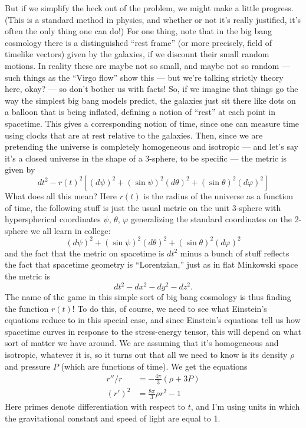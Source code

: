 \documentclass[12pt]{article}
\begin{document}
But if we simplify the heck out of the problem, we might make a little
progress. (This is a standard method in physics, and whether or not it's
really justified, it's often the only thing one can do!) For one thing,
note that in the big bang cosmology there is a distinguished ``rest
frame'' (or more precisely, field of timelike vectors) given by the
galaxies, if we discount their small random motions. In reality these
are maybe not so small, and maybe not so random --- such things as the
``Virgo flow'' show this --- but we're talking strictly theory here,
okay? --- so don't bother us with facts! So, if we imagine that things
go the way the simplest big bang models predict, the galaxies just sit
there like dots on a balloon that is being inflated, defining a notion
of ``rest'' at each point in spacetime. This gives a corresponding
notion of time, since one can measure time using clocks that are at rest
relative to the galaxies. Then, since we are pretending the universe is
completely homogeneous and isotropic --- and let's say it's a closed
universe in the shape of a 3-sphere, to be specific --- the metric is
given by
\[dt^2-r(t)^2[(d\psi)^2 + (\sin \psi)^2{(d\theta)^2 + (\sin \theta)^2 (d\varphi)^2}]\]
What does all this mean? Here \(r(t)\) is the radius of the universe as
a function of time, the following stuff is just the usual metric on the
unit 3-sphere with hyperspherical coordinates \(\psi\), \(\theta\),
\(\varphi\) generalizing the standard coordinates on the 2-sphere we all
learn in college:
\[(d\psi)^2 + (\sin \psi)^2{(d\theta)^2 + (\sin \theta)^2 (d\varphi)^2}\]
and the fact that the metric on spacetime is \(dt^2\) minus a bunch of
stuff reflects the fact that spacetime geometry is ``Lorentzian,'' just
as in flat Minkowski space the metric is \[dt^2-dx^2-dy^2-dz^2.\] The
name of the game in this simple sort of big bang cosmology is thus
finding the function \(r(t)\)! To do this, of course, we need to see
what Einstein's equations reduce to in this special case, and since
Einstein's equations tell us how spacetime curves in response to the
stress-energy tensor, this will depend on what sort of matter we have
around. We are assuming that it's homogeneous and isotropic, whatever it
is, so it turns out that all we need to know is its density \(\rho\) and
pressure \(P\) (which are functions of time). We get the equations
\[\begin{aligned}r''/r &= -\frac{4\pi}{3}(\rho+3P) \\ (r')^2 &= \frac{8\pi}{3}\rho r^2-1\end{aligned}\]
Here primes denote differentiation with respect to \(t\), and I'm using
units in which the gravitational constant and speed of light are equal
to 1.
\end{document}
